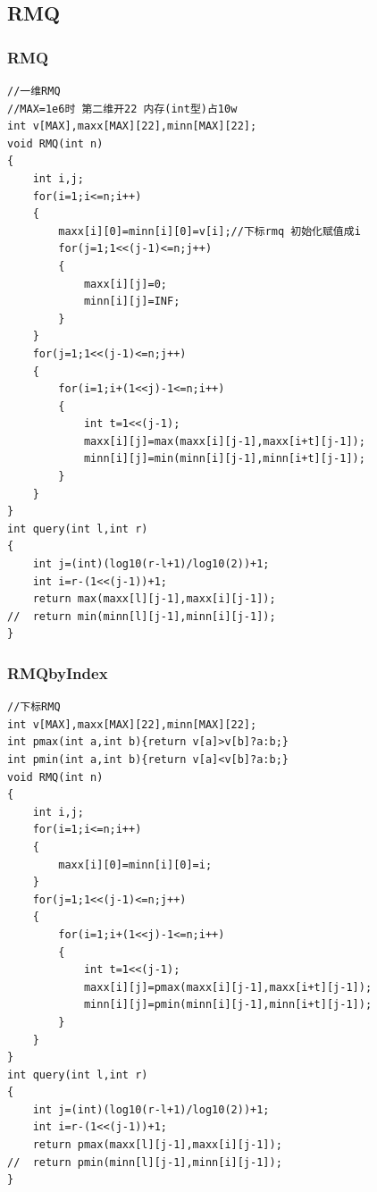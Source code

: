 \documentclass[twoside]{article}
\begin{document}
\subsection{RMQ}
\subsubsection{RMQ}
\begin{lstlisting}
//一维RMQ
//MAX=1e6时 第二维开22 内存(int型)占10w
int v[MAX],maxx[MAX][22],minn[MAX][22];
void RMQ(int n)
{
	int i,j;
	for(i=1;i<=n;i++)
	{
		maxx[i][0]=minn[i][0]=v[i];//下标rmq 初始化赋值成i
		for(j=1;1<<(j-1)<=n;j++)
		{
			maxx[i][j]=0;
			minn[i][j]=INF;
		}
	}
	for(j=1;1<<(j-1)<=n;j++)
	{
		for(i=1;i+(1<<j)-1<=n;i++)
		{
			int t=1<<(j-1);
			maxx[i][j]=max(maxx[i][j-1],maxx[i+t][j-1]);
			minn[i][j]=min(minn[i][j-1],minn[i+t][j-1]);
		}
	}
}
int query(int l,int r)
{
	int j=(int)(log10(r-l+1)/log10(2))+1;
	int i=r-(1<<(j-1))+1;
	return max(maxx[l][j-1],maxx[i][j-1]);
//	return min(minn[l][j-1],minn[i][j-1]);
}\end{lstlisting}
\subsubsection{RMQbyIndex}
\begin{lstlisting}
//下标RMQ
int v[MAX],maxx[MAX][22],minn[MAX][22];
int pmax(int a,int b){return v[a]>v[b]?a:b;}
int pmin(int a,int b){return v[a]<v[b]?a:b;}
void RMQ(int n)
{
	int i,j;
	for(i=1;i<=n;i++)
	{
		maxx[i][0]=minn[i][0]=i;
	}
	for(j=1;1<<(j-1)<=n;j++)
	{
		for(i=1;i+(1<<j)-1<=n;i++)
		{
			int t=1<<(j-1);
			maxx[i][j]=pmax(maxx[i][j-1],maxx[i+t][j-1]);
			minn[i][j]=pmin(minn[i][j-1],minn[i+t][j-1]);
		}
	}
}
int query(int l,int r)
{
	int j=(int)(log10(r-l+1)/log10(2))+1;
	int i=r-(1<<(j-1))+1;
	return pmax(maxx[l][j-1],maxx[i][j-1]);
//	return pmin(minn[l][j-1],minn[i][j-1]);
}
\end{lstlisting}
\end{document}
